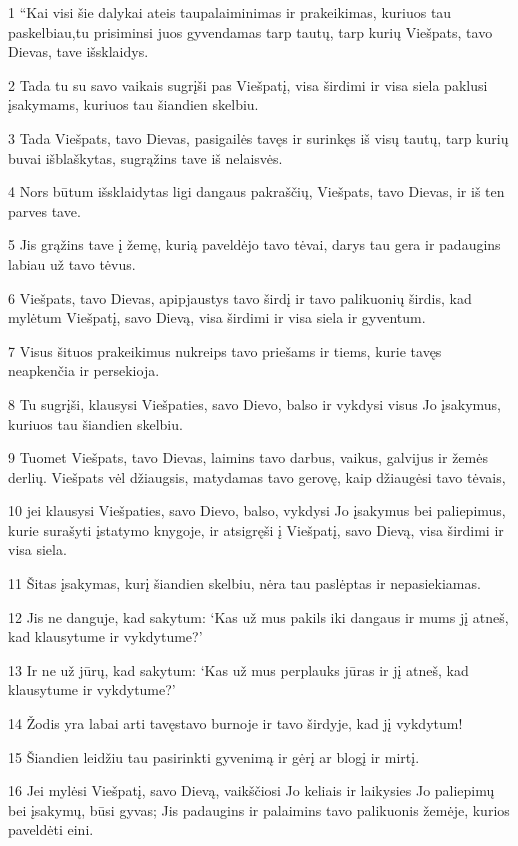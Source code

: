 \par 1 “Kai visi šie dalykai ateis tau­palaiminimas ir prakeikimas, kuriuos tau paskelbiau,­tu prisiminsi juos gyvendamas tarp tautų, tarp kurių Viešpats, tavo Dievas, tave išsklaidys. 
\par 2 Tada tu su savo vaikais sugrįši pas Viešpatį, visa širdimi ir visa siela paklusi įsakymams, kuriuos tau šiandien skelbiu. 
\par 3 Tada Viešpats, tavo Dievas, pasigailės tavęs ir surinkęs iš visų tautų, tarp kurių buvai išblaškytas, sugrąžins tave iš nelaisvės. 
\par 4 Nors būtum išsklaidytas ligi dangaus pakraščių, Viešpats, tavo Dievas, ir iš ten parves tave. 
\par 5 Jis grąžins tave į žemę, kurią paveldėjo tavo tėvai, darys tau gera ir padaugins labiau už tavo tėvus. 
\par 6 Viešpats, tavo Dievas, apipjaustys tavo širdį ir tavo palikuonių širdis, kad mylėtum Viešpatį, savo Dievą, visa širdimi ir visa siela ir gyventum. 
\par 7 Visus šituos prakeikimus nukreips tavo priešams ir tiems, kurie tavęs neapkenčia ir persekioja. 
\par 8 Tu sugrįši, klausysi Viešpaties, savo Dievo, balso ir vykdysi visus Jo įsakymus, kuriuos tau šiandien skelbiu. 
\par 9 Tuomet Viešpats, tavo Dievas, laimins tavo darbus, vaikus, galvijus ir žemės derlių. Viešpats vėl džiaugsis, matydamas tavo gerovę, kaip džiaugėsi tavo tėvais, 
\par 10 jei klausysi Viešpaties, savo Dievo, balso, vykdysi Jo įsakymus bei paliepimus, kurie surašyti įstatymo knygoje, ir atsigręši į Viešpatį, savo Dievą, visa širdimi ir visa siela. 
\par 11 Šitas įsakymas, kurį šiandien skelbiu, nėra tau paslėptas ir nepasiekiamas. 
\par 12 Jis ne danguje, kad sakytum: ‘Kas už mus pakils iki dangaus ir mums jį atneš, kad klausytume ir vykdytume?’ 
\par 13 Ir ne už jūrų, kad sakytum: ‘Kas už mus perplauks jūras ir jį atneš, kad klausytume ir vykdytume?’ 
\par 14 Žodis yra labai arti tavęs­tavo burnoje ir tavo širdyje, kad jį vykdytum! 
\par 15 Šiandien leidžiu tau pasirinkti gyvenimą ir gėrį ar blogį ir mirtį. 
\par 16 Jei mylėsi Viešpatį, savo Dievą, vaikščiosi Jo keliais ir laikysies Jo paliepimų bei įsakymų, būsi gyvas; Jis padaugins ir palaimins tavo palikuonis žemėje, kurios paveldėti eini. 
